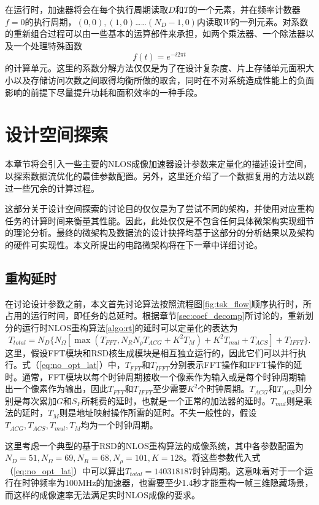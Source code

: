 \documentclass[master]{shtthesis}             %
\begin{document}
在运行时，加速器将会在每个执行周期读取$D$和$T$的一个元素，并在频率计数器$f=0$的执行周期，$(0,0),(1,0)$……$(N_D-1,0)$内读取$W$的一列元素。对系数的重新组合过程可以由一些基本的运算部件来承担，如两个乘法器、一个除法器以及一个处理特殊函数
\begin{equation}
    f(t) = e^{-i2\pi t}
\end{equation}
的计算单元。这里的系数分解方法仅仅是为了在设计复杂度、片上存储单元面积大小以及存储访问次数之间取得均衡所做的取舍，同时在不对系统造成性能上的负面影响的前提下尽量提升功耗和面积效率的一种手段。

\section{设计空间探索}\label{sec:dse}

本章节将会引入一些主要的NLOS成像加速器设计参数来定量化的描述设计空间，以探索数据流优化的最佳参数配置。另外，这里还介绍了一个数据复用的方法以跳过一些冗余的计算过程。

这部分关于设计空间探索的讨论目的仅仅是为了尝试不同的架构，并使用对应重构任务的计算时间来衡量其性能。因此，此处仅仅是不包含任何具体微架构实现细节的理论分析。最终的微架构及数据流的设计抉择均基于这部分的分析结果以及架构的硬件可实现性。本文所提出的电路微架构将在下一章中详细讨论。

\subsection{重构延时}

在讨论设计参数之前，本文首先讨论算法按照流程图\ref{fig:tsk_flow}顺序执行时，所占用的运行时间，即任务的总延时。根据章节\ref{sec:coef_decomp}所讨论的，重新划分的运行时NLOS重构算法\ref{algo:rt}的延时可以定量化的表达为
\begin{equation} \label{eq:no_opt_lat}
    T_{total} = N_D \{ N_{\Omega}[ \max (T_{FFT}, N_RN_{\rho}T_{ACG}+K^2T_M)+ K^2T_{mul}+T_{ACS} ] + T_{IFFT}\}.
\end{equation}
这里，假设FFT模块和RSD核生成模块是相互独立运行的，因此它们可以并行执行。式（\ref{eq:no_opt_lat}）中，$T_{FFT}$和$T_{IFFT}$分别表示FFT操作和IFFT操作的延时。通常，FFT模块以每个时钟周期接收一个像素作为输入或是每个时钟周期输出一个像素作为输出，因此$T_{FFT}$和$T_{IFFT}$至少需要$K^2$个时钟周期。$T_{ACG}$和$T_{ACS}$则分别是每次累加$G$和$S_F$所耗费的延时，也就是一个正常的加法器的延时。$T_{mul}$则是乘法的延时，$T_M$则是地址映射操作所需的延时。不失一般性的，假设$T_{ACG},T_{ACS},T_{mul},T_M$均为一个时钟周期。

这里考虑一个典型的基于RSD的NLOS重构算法的成像系统\citep{Liu2020}，其中各参数配置为$N_D=51, N_\Omega=69, N_R=68, N_\rho=101, K=128$。将这些参数代入式（\ref{eq:no_opt_lat}）中可以算出$T_{total}=140318187$时钟周期。这意味着对于一个运行在时钟频率为100MHz的加速器，也需要至少1.4秒才能重构一帧三维隐藏场景，而这样的成像速率无法满足实时NLOS成像的要求。
\end{document}
